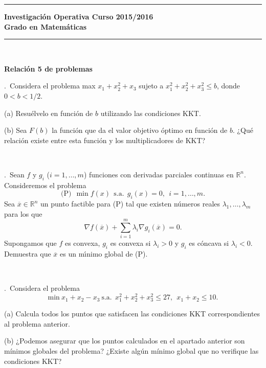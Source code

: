 \documentclass[12pt,a4paper,twoside]{article}
\newcounter{problem} \setcounter{problem}{1}
\newcommand{\ex}{\noindent {\sf \bf \theproblem}\addtocounter{problem}{1}.\ }
\begin{document}



\hrule
\bigskip
\textbf{Investigación Operativa   \hfill Curso 2015/2016\\
Grado en Matemáticas}
\bigskip
\hrule

\


\begin{center}  {\bf \large
Relaci\'{o}n 5 de problemas}
\end{center}




\ex Considera el problema max $x_1+x_2^2+x_3$ sujeto a $x_1^2+x_2^2+x_3^2\leq b$, donde $0<b<1/2$.
\begin{compactitem}
\item[(a)] Resuélvelo en función de $b$ utilizando las condiciones KKT.
\item[(b)] Sea $F(b)$ la función que da el valor objetivo óptimo en función de $b$. ¿Qué relación existe entre esta función y los multiplicadores de KKT?
\end{compactitem}


\

\ex Sean $f$ y $g_i$ ($i=1,\ldots,m$) funciones con derivadas
parciales continuas en $\mathbb{R}^n$. Consideremos el problema
\[
\mbox{(P)}\ \ \min f(x) \ \ \mbox{s.a.}\ \ g_i(x)=0,\ \ i=1,\ldots, m.
\]
Sea $\overline{x}\in\mathbb{R}^n$ un punto factible para (P)
tal que existen n\'umeros reales $\lambda_1,\ldots,\lambda_m$
para los  que
\[
\nabla f(\overline{x})+\sum_{i=1}^m\lambda_i
\nabla g_i(\overline{x})=0.
\]
Supongamos que $f$ es convexa, $g_i$ es convexa si $\lambda_i>0$
y $g_i$ es c\'oncava si $\lambda_i<0$. Demuestra que
$\overline{x}$ es un m\'{\i}nimo global de (P).


\

\ex Considera el problema 
\[
\mbox{min}\ x_1+x_2-x_3 \ \mbox{s.a.}\ \ x_1^2+x_2^2+x_3^2\leq 27,\ \ x_1+x_2\leq 10.
\]
\begin{compactitem}
\item[(a)] Calcula todos los puntos que satisfacen las condiciones KKT correspondientes al problema anterior.
\item[(b)] ¿Podemos asegurar que los puntos calculados en el apartado anterior son mínimos globales del problema? ¿Existe algún mínimo global que no verifique las condiciones KKT?
\end{compactitem}
\end{document}
